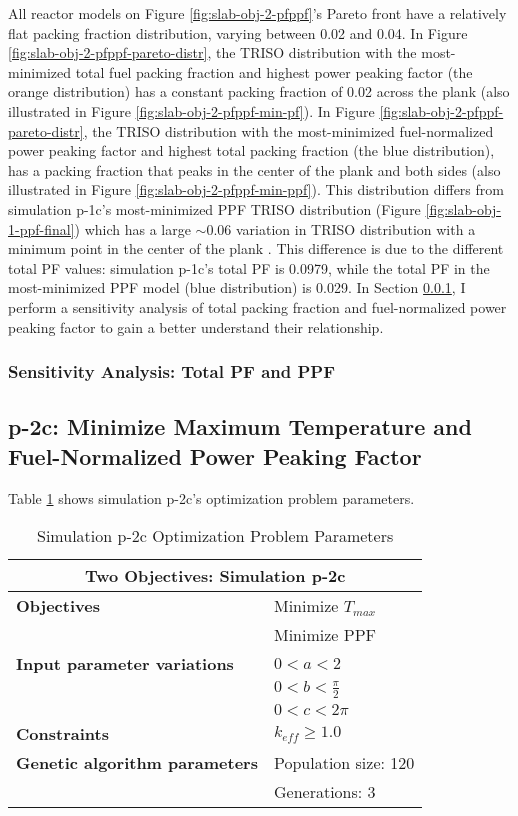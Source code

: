 All reactor models on Figure \ref{fig:slab-obj-2-pfppf}'s Pareto front have a relatively flat 
packing fraction distribution, varying between 0.02 and 0.04. 
In Figure \ref{fig:slab-obj-2-pfppf-pareto-distr}, the TRISO distribution with the 
most-minimized total fuel packing fraction and highest power peaking factor 
(the orange distribution) has a constant packing fraction of 0.02 across the plank
(also illustrated in Figure \ref{fig:slab-obj-2-pfppf-min-pf}). 
In Figure \ref{fig:slab-obj-2-pfppf-pareto-distr}, the TRISO distribution with the 
most-minimized fuel-normalized power peaking factor and highest total packing fraction 
(the blue distribution), has a packing fraction that peaks in the center of the plank
and both sides (also illustrated in Figure \ref{fig:slab-obj-2-pfppf-min-ppf}). 
This distribution differs from simulation p-1c's most-minimized PPF TRISO distribution 
(Figure \ref{fig:slab-obj-1-ppf-final}) which has a large $\sim 0.06$ variation in
TRISO distribution with a minimum point in the center of the plank . 
This difference is due to the different total PF values: simulation p-1c's total PF is 
0.0979, while the total PF in the most-minimized PPF model (blue distribution) is 0.029. 
In Section \ref{sec:p-2b-pf-ppf-study}, I perform a sensitivity analysis of total packing 
fraction and fuel-normalized power peaking factor to gain a better understand their 
relationship. 

\subsubsection{Sensitivity Analysis: Total PF and PPF}
\label{sec:p-2b-pf-ppf-study}

\subsection{p-2c: Minimize Maximum Temperature and Fuel-Normalized Power Peaking Factor}
\label{sec:p-2c}
Table \ref{tab:simulationp2c} shows simulation p-2c's optimization problem parameters. 
\begin{table}[htbp!]
    \centering
    \onehalfspacing
    \caption{Simulation p-2c Optimization Problem Parameters}
	\label{tab:simulationp2c}
    \footnotesize
    \begin{tabular}{l|p{3cm}}
    \hline 
    \multicolumn{2}{c}{\textbf{Two Objectives: Simulation p-2c}} \\
    \hline 
    \textbf{Objectives} & Minimize $T_{max}$ \\
    & Minimize PPF \\
    \hline 
    \textbf{Input parameter variations} & $0<a<2$ \\
    & $0<b<\frac{\pi}{2}$ \\
    & $0<c<2\pi$ \\
    \hline
    \textbf{Constraints} & $k_{eff} \geq 1.0$\\ 
    \hline 
    \textbf{Genetic algorithm parameters} & Population size: 120 \\
    & Generations: 3 \\
    \hline
    \end{tabular}
\end{table}

